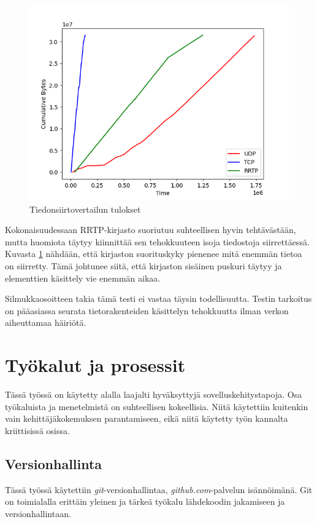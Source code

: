 \documentclass[a4paper,12pt]{article}
\begin{document}
    \begin{figure}[h!]
        \centering
        \includegraphics[width=\textwidth]{doc/latex/src/images/plot.png}
        \caption{Tiedonsiirtovertailun tulokset}
        \label{fig:performance}
    \end{figure}

    
Kokonaisuudessaan RRTP-kirjasto suoriutuu suhteellisen hyvin tehtävästään, mutta huomiota täytyy kiinnittää sen tehokkuuteen isoja tiedostoja siirrettäessä. Kuvasta \ref{fig:performance} nähdään, että kirjaston suorituskyky pienenee mitä enemmän tietoa on siirretty. Tämä johtunee siitä, että kirjaston sisäinen puskuri täytyy ja elementtien käsittely vie enemmän aikaa.



Silmukkaosoitteen takia tämä testi ei vastaa täysin todellisuutta.
Testin tarkoitus on pääasiassa seurata tietorakenteiden käsittelyn tehokkuutta ilman
verkon aiheuttamaa häiriötä.


    \section{Työkalut ja prosessit}
    Tässä työssä on käytetty alalla laajalti hyväksyttyjä sovelluskehitystapoja. Osa työkaluista ja menetelmistä on suhteellisen kokeellisia. Niitä käytettiin kuitenkin vain kehittäjäkokemuksen parantamiseen, eikä niitä käytetty työn kannalta kriittisissä osissa.

    \subsection{Versionhallinta}
    Tässä työssä käytettiin \textit{git}-versionhallintaa, \textit{github.com}-palvelun isännöimänä. Git on toimialalla erittäin yleinen ja tärkeä työkalu lähdekoodin jakamiseen ja versionhallintaan. \par
\end{document}
